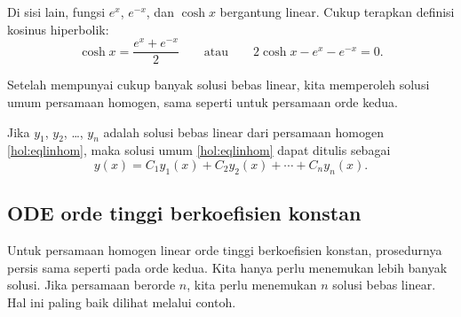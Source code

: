 \begin{example}
Di sisi lain, fungsi $e^x$, $e^{-x}$, dan $\cosh x$ bergantung linear. Cukup terapkan definisi kosinus hiperbolik:
\begin{equation*}
\cosh x = \frac{e^x + e^{-x}}{2}
\qquad
\text{atau}
\qquad
2 \cosh x - e^x - e^{-x} = 0.
\end{equation*}
\end{example}

Setelah mempunyai cukup banyak solusi bebas linear, kita memperoleh solusi umum persamaan homogen, sama seperti untuk persamaan orde kedua.

\begin{theorem}
Jika $y_1$, $y_2$, \ldots, $y_n$ adalah solusi bebas linear dari persamaan homogen \eqref{hol:eqlinhom}, maka solusi umum \eqref{hol:eqlinhom} dapat ditulis sebagai
\begin{equation*}
y(x) = C_1 y_1(x) + C_2 y_2(x) + \cdots + C_n y_n(x) .
\end{equation*}
\end{theorem}

\subsection{ODE orde tinggi berkoefisien konstan}

Untuk persamaan homogen linear orde tinggi berkoefisien konstan, prosedurnya persis sama seperti pada orde kedua. Kita hanya perlu menemukan lebih banyak solusi. Jika persamaan berorde $n$, kita perlu menemukan $n$ solusi bebas linear. Hal ini paling baik dilihat melalui contoh.

